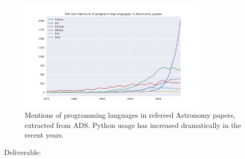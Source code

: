 \begin{task}[
  title=Astronomy application,
  id=astro,
  lead=CDS,
  PM=18,
  wphases={0-48},
  partners={QS,WTT,SRL,INSERM,XFEL}
]
\begin{figure}[ht]\centering
  \includegraphics[width=0.8\textwidth]{python-astro-citations}
  \caption{Mentions of programming languages in refereed Astronomy papers, extracted from ADS. Python usage has increased dramatically in the recent years.}\label{fig:python-astro-citations}
\end{figure}

Deliverable: 


\end{task}
